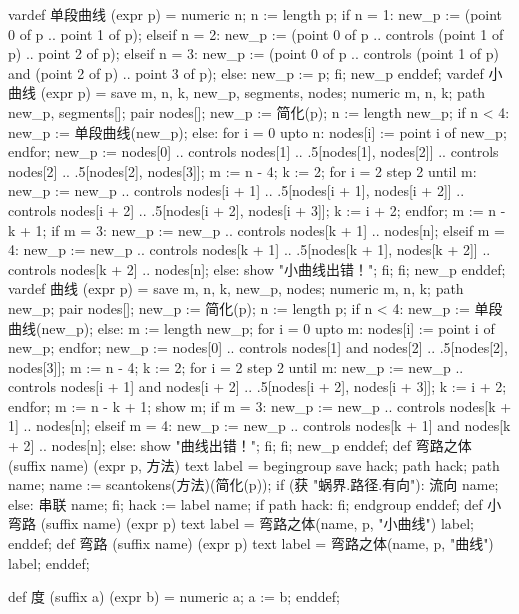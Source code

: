 \startMPinclusions[+]
vardef 单段曲线 (expr p) =
  numeric n; n := length p;
  if n = 1:
    new_p := (point 0 of p .. point 1 of p);
  elseif n = 2:
    new_p := (point 0 of p .. controls (point 1 of p) .. point 2 of p);
  elseif n = 3:
    new_p := (point 0 of p .. 
        controls (point 1 of p) and (point 2 of p) 
        .. point 3 of p);
  else:
    new_p := p;
  fi;
  new_p
enddef;
vardef 小曲线 (expr p) =
  save m, n, k, new_p, segments, nodes;
  numeric m, n, k; path new_p, segments[]; pair nodes[];
  new_p := 简化(p);
  n := length new_p;
  if n < 4:
    new_p := 单段曲线(new_p);
  else:
    for i = 0 upto n:
      nodes[i] := point i of new_p;
    endfor;
    new_p := nodes[0] 
          .. controls nodes[1]
          .. .5[nodes[1], nodes[2]]
          .. controls nodes[2]
          .. .5[nodes[2], nodes[3]];
    m := n - 4;
    k := 2;
    for i = 2 step 2 until m:
      new_p := new_p
          .. controls nodes[i + 1]
          .. .5[nodes[i + 1], nodes[i + 2]]
          .. controls nodes[i + 2]
          .. .5[nodes[i + 2], nodes[i + 3]];
      k := i + 2;
    endfor;
    m := n - k + 1;
    if m = 3:
      new_p := new_p .. controls nodes[k + 1] .. nodes[n];
    elseif m = 4:
      new_p := new_p 
        .. controls nodes[k + 1]
        .. .5[nodes[k + 1], nodes[k + 2]]
        .. controls nodes[k + 2]
        .. nodes[n];
    else:
      show "小曲线出错！";
    fi;
  fi;
  new_p
enddef;
vardef 曲线 (expr p) =
  save m, n, k, new_p, nodes;
  numeric m, n, k; path new_p; pair nodes[];
  new_p := 简化(p);
  n := length p;
  if n < 4:
    new_p := 单段曲线(new_p);
  else:
    m := length new_p;
    for i = 0 upto m:
      nodes[i] := point i of new_p;
    endfor;
    new_p := nodes[0] 
      .. controls nodes[1] and nodes[2] 
      .. .5[nodes[2], nodes[3]];
    m := n - 4;
    k := 2;
    for i = 2 step 2 until m:
      new_p := new_p 
        .. controls nodes[i + 1] and nodes[i + 2] 
        .. .5[nodes[i + 2], nodes[i + 3]];
      k := i + 2;
    endfor;
    m := n - k + 1;
    show m;
    if m = 3:
      new_p := new_p .. controls nodes[k + 1] .. nodes[n];
    elseif m = 4:
      new_p := new_p 
        .. controls nodes[k + 1] and nodes[k + 2]
        .. nodes[n];
    else:
      show "曲线出错！";
    fi;
  fi;
  new_p
enddef;
def 弯路之体 (suffix name) (expr p, 方法) text label =
  begingroup
  save hack; path hack;
  path name; name := scantokens(方法)(简化(p));
  if (获 "蜗界.路径.有向"):
    流向 name;
  else:
    串联 name;
  fi;
  hack := label name;
  if path hack: fi;
  endgroup
enddef;
def 小弯路 (suffix name) (expr p) text label =
  弯路之体(name, p, "小曲线") label;
enddef;
def 弯路 (suffix name) (expr p) text label =
  弯路之体(name, p, "曲线") label;
enddef;
\stopMPinclusions

\startMPinclusions[+]
def 度 (suffix a) (expr b) =
  numeric a;
  a := b;
enddef;
\stopMPinclusions
